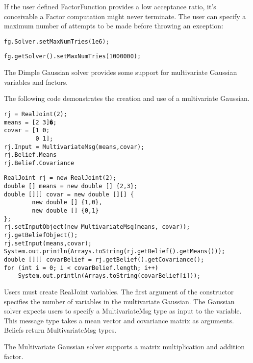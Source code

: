
If the user defined FactorFunction provides a low acceptance ratio, it's conceivable a Factor computation might never terminate. The user can specify a maximum number of attempts to be made before throwing an exception:

\ifmatlab
\begin{lstlisting}
fg.Solver.setMaxNumTries(1e6);
\end{lstlisting}
\fi

\ifjava
\begin{lstlisting}
fg.getSolver().setMaxNumTries(1000000);
\end{lstlisting}
\fi

\label{sec:MultivariateGaussians}

The Dimple Gaussian solver provides some support for multivariate Gaussian variables and factors.


The following code demonstrates the creation and use of a multivariate Gaussian.

\ifmatlab
\begin{lstlisting}
rj = RealJoint(2);
means = [2 3]�;
covar = [1 0;
         0 1];
rj.Input = MultivariateMsg(means,covar);
rj.Belief.Means
rj.Belief.Covariance
\end{lstlisting}
\fi

\ifjava
\begin{lstlisting}
RealJoint rj = new RealJoint(2);
double [] means = new double [] {2,3};
double [][] covar = new double [][] {
		new double [] {1,0},
		new double [] {0,1}
};
rj.setInputObject(new MultivariateMsg(means, covar));
rj.getBeliefObject();
rj.setInput(means,covar);
System.out.println(Arrays.toString(rj.getBelief().getMeans()));
double [][] covarBelief = rj.getBelief().getCovariance();
for (int i = 0; i < covarBelief.length; i++)
	System.out.println(Arrays.toString(covarBelief[i]));
\end{lstlisting}
\fi

Users must create RealJoint variables.  The first argument of the constructor specifies the number of variables in the multivariate Gaussian.  The Gaussian solver expects users to specify a MultivariateMsg type as input to the variable.  This message type takes a mean vector and covariance matrix as arguments.  Beliefs return MultivariateMsg types.



The Multivariate Gaussian solver supports a matrix multiplication and addition factor.  

